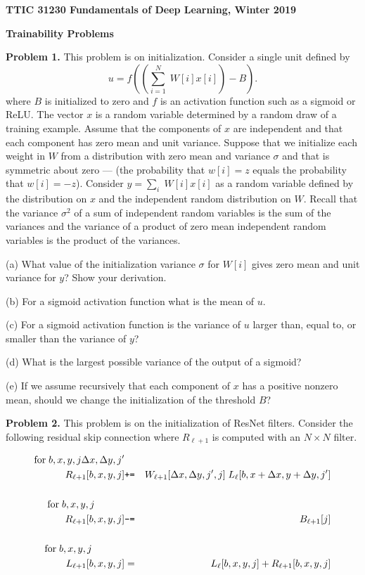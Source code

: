\documentclass{article}
\begin{document}
\centerline{\bf TTIC 31230 Fundamentals of Deep Learning, Winter 2019}

\bigskip
\centerline{\bf Trainability Problems}

\bigskip
{\bf Problem 1.}  This problem is on initialization.  Consider a single unit defined by
$$u = f\left(\left(\sum_{i=1}^N\;W[i]x[i]\right) - B\right).$$
where $B$ is initialized to zero and $f$ is an activation function such as a sigmoid or ReLU.
The vector $x$ is a random variable determined by a random draw of a training example.
Assume that the components of $x$ are independent and that each component has zero mean and unit variance.
Suppose that we initialize each weight in $W$ from a distribution with
zero mean and variance $\sigma$ and that is symmetric about zero --- (the probability that $w[i] = z$ equals the probability that $w[i] = -z$).
Consider $y = \sum_i\;W[i]x[i]$ as a random variable defined by the distribution on $x$ and the independent random distribution on $W$.
Recall that the variance $\sigma^2$ of
a sum of independent random variables is the sum of the variances and the variance of a product of zero mean independent
random variables is the product of the variances.

\medskip
(a) What value of the initialization variance
$\sigma$ for $W[i]$ gives zero mean and unit variance for $y$?  Show your derivation.

\medskip
(b) For a sigmoid activation function what is the mean of $u$.

\medskip
(c) For a sigmoid activation function
is the variance of $u$ larger than, equal to, or smaller than the variance of $y$?

\medskip
(d) What is the largest possible variance of the output of a sigmoid?

\medskip
(e) If we assume recursively that each component of $x$ has a positive nonzero mean, should we change the initialization of the threshold $B$?

\bigskip
{\bf Problem 2.} This problem is on the initialization of ResNet filters.
Consider the following residual skip connection where $R_{\ell+1}$ is computed with an $N \times N$ filter.

\begin{eqnarray*}
  \mathrm{for}\;b,x,y,j\Delta x,\Delta y,j' \\
  \;\;\;  R_{\ell+1}[b,x,y,j] & \mbox{\tt +=} & W_{\ell+1}[\Delta x, \Delta y, j',j]\; L_{\ell}[b,x + \Delta x, y + \Delta y, j'] \\
  \\
  \mathrm{for}\;b,x,y,j \;\;\;\;\;\;\;\;\;\;\;\\
    \;\;\;  R_{\ell+1}[b,x,y,j] & \mbox{\tt -=} & B_{\ell+1}[j] \\
\\
\mathrm{for}\;b,x,y,j\;\;\;\;\;\;\;\;\;\;\;\;\\
L_{\ell+1}[b,x,y,j] & = & L_{\ell}[b,x,y,j] + R_{\ell+1}[b,x,y,j]
\end{eqnarray*}
\end{document}
